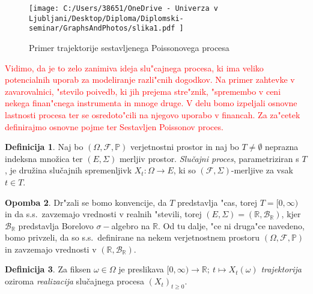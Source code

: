 \documentclass[12pt, a4paper, reqno]{amsart}
\theoremstyle{definition} %
\newtheorem{definicija}{Definicija}[section]
\newtheorem{opomba}[definicija]{Opomba}
\theoremstyle{plain} %
\newcommand{\R}{\mathbb{R}}
\newcommand{\B}{\mathcal{B}}
\newcommand{\1}{\mathds{1}}
\begin{document}
    \begin{figure}[H]
        \centering
        \texttt{[image: 
            C:/Users/38651/OneDrive - Univerza v Ljubljani/Desktop/Diploma/Diplomski-seminar/GraphsAndPhotos/slika1.pdf
            ]}
        \caption{Primer trajektorije sestavljenega Poissonovega procesa}
        \label{fig:slika1}
    \end{figure}
    
    \noindent
\textcolor{red}{
    Vidimo, da je to zelo zanimiva ideja slu"cajnega
    procesa, ki ima veliko potencialnih uporab za modeliranje razli"cnih dogodkov. Na primer zahtevke 
    v zavarovalnici, "stevilo poivedb, ki jih prejema stre"znik, "spremembo v ceni nekega finan"cnega 
    instrumenta in mnoge druge. V delu bomo izpeljali osnovne lastnosti procesa ter se osredoto"cili 
    na njegovo uporabo v financah. Za za"cetek definirajmo osnovne pojme ter Sestavljen Poissonov proces.
}

    \begin{definicija}
        Naj bo $(\Omega, \mathcal{F}, \mathbb{P})$ verjetnostni prostor in naj bo $T\neq\emptyset$
        neprazna indeksna množica ter $(E, \Sigma)$ merljiv prostor. \textit{Slučajni proces}, 
        parametriziran s $T$, je družina slučajnih spremenljivk $X_t : \Omega \to E$,
         ki so $(\mathcal{F}, \Sigma)$-merljive za vsak $t \in T$.
        \label{def:slucProc}
    \end{definicija}

    \begin{opomba}
        Dr"zali se bomo konvencije, da $T$ predstavlja "cas, torej $T = [0, \infty)$ in da s.s.\
        zavzemajo vrednosti v realnih "stevili, torej $(E, \Sigma) = (\R, \B_{\R})$, kjer $\B_\R$ 
        predstavlja Borelovo $\sigma-$algebro na $\R$. Od tu dalje, "ce ni druga"ce navedeno, bomo 
        privzeli, da so s.s.\ definirane na nekem verjetnostnem prostoru 
        $(\Omega, \mathcal{F}, \mathbb{P})$ in zavzemajo vrednosti v $(\R, \B_{\R})$.
        \label{op:Konvencije}
    \end{opomba}


    \begin{definicija}
        Za fiksen $\omega \in \Omega$ je preslikava 
        $[0, \infty) \rightarrow \mathbb{R}; \ t \mapsto X_t(\omega)$ 
        \textit{trajektorija} oziroma \textit{realizacija} slučajnega procesa $(X_t)_{t\geq0}$.
        \label{def:realizac}
    \end{definicija}
\end{document}
